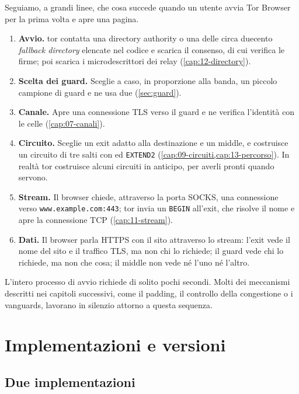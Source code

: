 Seguiamo, a grandi linee, che cosa succede quando un utente avvia Tor Browser per la prima volta e apre una pagina.
\begin{enumerate}
  \item \textbf{Avvio.} tor contatta una directory authority o una delle circa duecento \emph{fallback directory} elencate nel codice e scarica il consenso, di cui verifica le firme; poi scarica i microdescrittori dei relay (\cref{cap:12-directory}).
  \item \textbf{Scelta dei guard.} Sceglie a caso, in proporzione alla banda, un piccolo campione di guard e ne usa due (\cref{sec:guard}).
  \item \textbf{Canale.} Apre una connessione TLS verso il guard e ne verifica l'identità con le celle  (\cref{cap:07-canali}).
  \item \textbf{Circuito.} Sceglie un exit adatto alla destinazione e un middle, e costruisce un circuito di tre salti con  ed \texttt{EXTEND2} (\cref{cap:09-circuiti,cap:13-percorso}). In realtà tor costruisce alcuni circuiti in anticipo, per averli pronti quando servono.
  \item \textbf{Stream.} Il browser chiede, attraverso la porta SOCKS, una connessione verso \texttt{www.example.com:443}; tor invia un \texttt{BEGIN} all'exit, che risolve il nome e apre la connessione TCP (\cref{cap:11-stream}).
  \item \textbf{Dati.} Il browser parla HTTPS con il sito attraverso lo stream: l'exit vede il nome del sito e il traffico TLS, ma non chi lo richiede; il guard vede chi lo richiede, ma non che cosa; il middle non vede né l'uno né l'altro.
\end{enumerate}
L'intero processo di avvio richiede di solito pochi secondi. Molti dei meccanismi descritti nei capitoli successivi, come il padding, il controllo della congestione o i vanguards, lavorano in silenzio attorno a questa sequenza.

\section{Implementazioni e versioni}\label{sec:arch-versioni}

\subsection{Due implementazioni}

